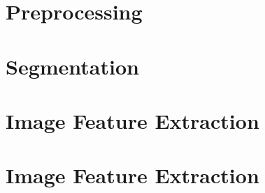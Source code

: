 \section{Preprocessing}
\section{Segmentation}
\section{Image Feature Extraction}
\section{Image Feature Extraction}